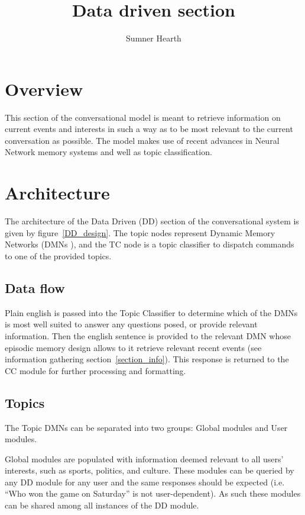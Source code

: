 \documentclass[12pt]{article}
\title{Data driven section}
\author{Sumner Hearth}
\date{} %
\begin{document}
\maketitle

\section{Overview}
This section of the conversational model is meant to retrieve information on current events and interests in such a way as to be most relevant to the current conversation as possible. The model makes use of recent advances in Neural Network memory systems and well as topic classification.

\section{Architecture}
The architecture of the Data Driven (DD) section of the conversational system is given by figure~\ref{DD_design}. The topic nodes represent Dynamic Memory Networks (DMNs \cite{Kumar:2015ys}), and the TC node is a topic classifier to dispatch commands to one of the provided topics. 

\subsection{Data flow}
Plain english is passed into the Topic Classifier to determine which of the DMNs is most well suited to answer any questions posed, or provide relevant information. Then the english sentence is provided to the relevant DMN whose episodic memory design allows to it retrieve relevant recent events (see information gathering section~\ref{section_info}). This response is returned to the CC module for further processing and formatting.

\subsection{Topics}
The Topic DMNs can be separated into two groups: Global modules and User modules. 

\noindent
Global modules are populated with information deemed relevant to all users' interests, such as sports, politics, and culture. These modules can be queried by any DD module for any user and the same responses should be expected (i.e. ``Who won the game on Saturday'' is not user-dependent). As such these modules can be shared among all instances of the DD module.
\end{document}
